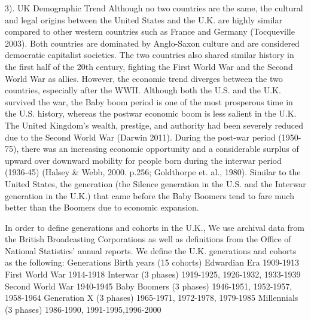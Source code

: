 3). UK Demographic Trend
Although no two countries are the same, the cultural and legal origins between the United States and the U.K. are highly similar compared to other western countries such as France and Germany (Tocqueville 2003). Both countries are dominated by Anglo-Saxon culture and are considered democratic capitalist societies. The two countries also shared similar history in the first half of the 20th century, fighting the First World War and the Second World War as allies. However, the economic trend diverges between the two countries, especially after the WWII. Although both the U.S. and the U.K. survived the war, the Baby boom period is one of the most prosperous time in the U.S. history, whereas the postwar economic boom is less salient in the U.K. The United Kingdom’s wealth, prestige, and authority had been severely reduced due to the Second World War (Darwin 2011). During the post-war period (1950-75), there was an increasing economic opportunity and a considerable surplus of upward over downward mobility for people born during the interwar period (1936-45) (Halsey & Webb, 2000. p.256; Goldthorpe et. al., 1980). Similar to the United States, the generation (the Silence generation in the U.S. and the Interwar generation in the U.K.) that came before the Baby Boomers tend to fare much better than the Boomers due to economic expansion.

In order to define generations and cohorts in the U.K., We use archival data from the British Broadcasting Corporations as well as definitions from the Office of National Statistics’ annual reports. We define the U.K. generations and cohorts as the following:
Generations
Birth years (15 cohorts)
Edwardian Era
1909-1913
First World War
1914-1918
Interwar (3 phases)
1919-1925, 1926-1932, 1933-1939
Second World War
1940-1945
Baby Boomers (3 phases)
1946-1951, 1952-1957, 1958-1964
Generation X (3 phases)
1965-1971, 1972-1978, 1979-1985
Millennials (3 phases)
1986-1990, 1991-1995,1996-2000

